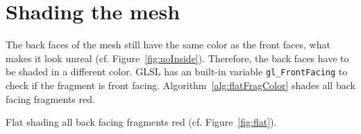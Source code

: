\section{Shading the mesh}
The back faces of the mesh still have the same color as the front faces, what makes it look unreal (cf. Figure~\ref{fig:noInside}). Therefore, the back faces have to be shaded in a different color. GLSL has an built-in variable \texttt{gl\_FrontFacing} to check if the fragment is front facing. Algorithm~\ref{alg:flatFragColor} shades all back facing fragments red.
\begin{algorithm}
 {\;}
\BlankLine
\caption{Flat shading all back facing fragments red (cf. Figure~\ref{fig:flat}).}
\label{alg:flatFragColor}
\end{algorithm}

